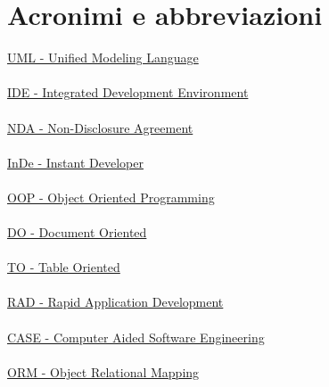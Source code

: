 \chapter{Acronimi e abbreviazioni}

\noindent \hyperref[UMLl]{UML - Unified Modeling Language}
\\
\\
\noindent \hyperref[IDE]{IDE - Integrated Development Environment}
\\
\\
\noindent \hyperref[NDA]{NDA - Non-Disclosure Agreement}
\\
\\
\noindent \hyperref[InDe]{InDe - Instant Developer}
\\
\\
\noindent \hyperref[OOP]{OOP - Object Oriented Programming}
\\
\\
\noindent \hyperref[DO]{DO - Document Oriented}
\\
\\
\noindent \hyperref[TO]{TO - Table Oriented}
\\
\\
\noindent \hyperref[RAD]{RAD - Rapid Application Development}
\\
\\
\noindent \hyperref[CASE]{CASE - Computer Aided Software Engineering}
\\
\\
\noindent \hyperref[ORM]{ORM - Object Relational Mapping}
\\
\\
